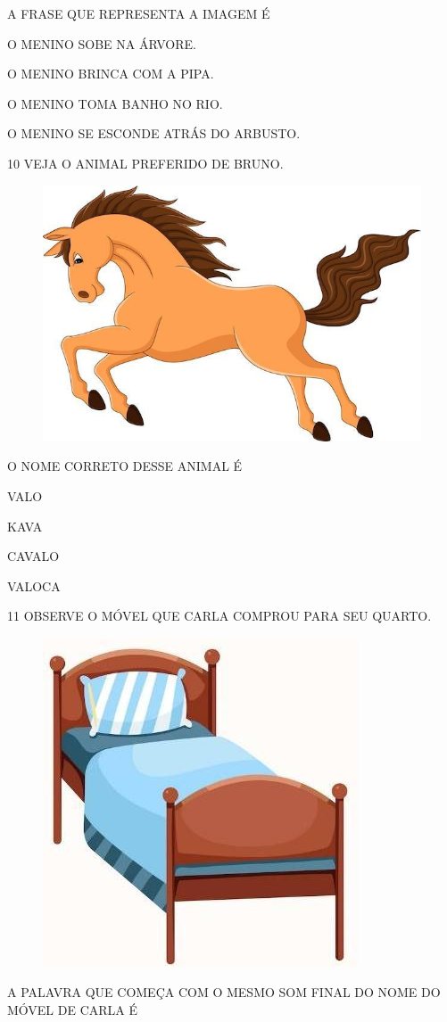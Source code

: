 \pagebreak
A FRASE QUE REPRESENTA A IMAGEM É

\begin{escolha}
\item O MENINO SOBE NA ÁRVORE.

\item O MENINO BRINCA COM A PIPA.

\item O MENINO TOMA BANHO NO RIO.

\item O MENINO SE ESCONDE ATRÁS DO ARBUSTO.
\end{escolha}

\num{10} VEJA O ANIMAL PREFERIDO DE BRUNO.

\begin{figure}[htpb]
\centering
\includegraphics[width=.3\textwidth]{media/image234.jpg}
\end{figure}


O NOME CORRETO DESSE ANIMAL É

\begin{escolha}
\item VALO

\item KAVA

\item CAVALO

\item VALOCA
\end{escolha}

\num{11} OBSERVE O MÓVEL QUE CARLA COMPROU PARA SEU QUARTO.

\begin{figure}[htpb]
\centering
\includegraphics[width=.2\textwidth]{media/image235.jpg}
\end{figure}

\pagebreak

A PALAVRA QUE COMEÇA COM O MESMO SOM FINAL DO NOME DO MÓVEL DE CARLA É 

